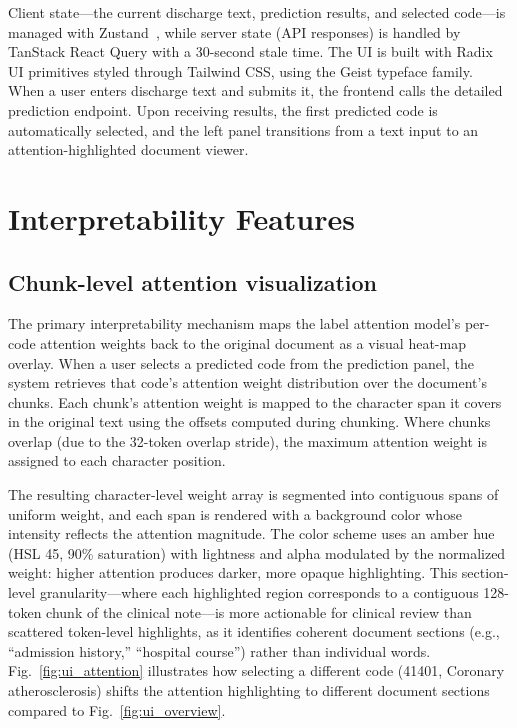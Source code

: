 \documentclass[conference]{IEEEtran}
\begin{document}
Client state---the current discharge text, prediction results, and selected code---is managed with Zustand~\cite{b_zustand}, while server state (API responses) is handled by TanStack React Query with a 30-second stale time. The UI is built with Radix UI primitives styled through Tailwind CSS, using the Geist typeface family. When a user enters discharge text and submits it, the frontend calls the detailed prediction endpoint. Upon receiving results, the first predicted code is automatically selected, and the left panel transitions from a text input to an attention-highlighted document viewer.

\section{Interpretability Features}

\subsection{Chunk-level attention visualization}

The primary interpretability mechanism maps the label attention model's per-code attention weights back to the original document as a visual heat-map overlay. When a user selects a predicted code from the prediction panel, the system retrieves that code's attention weight distribution over the document's chunks. Each chunk's attention weight is mapped to the character span it covers in the original text using the offsets computed during chunking. Where chunks overlap (due to the 32-token overlap stride), the maximum attention weight is assigned to each character position.

The resulting character-level weight array is segmented into contiguous spans of uniform weight, and each span is rendered with a background color whose intensity reflects the attention magnitude. The color scheme uses an amber hue (HSL 45\textdegree, 90\% saturation) with lightness and alpha modulated by the normalized weight: higher attention produces darker, more opaque highlighting. This section-level granularity---where each highlighted region corresponds to a contiguous 128-token chunk of the clinical note---is more actionable for clinical review than scattered token-level highlights, as it identifies coherent document sections (e.g., ``admission history,'' ``hospital course'') rather than individual words. Fig.~\ref{fig:ui_attention} illustrates how selecting a different code (41401, Coronary atherosclerosis) shifts the attention highlighting to different document sections compared to Fig.~\ref{fig:ui_overview}.
\end{document}
